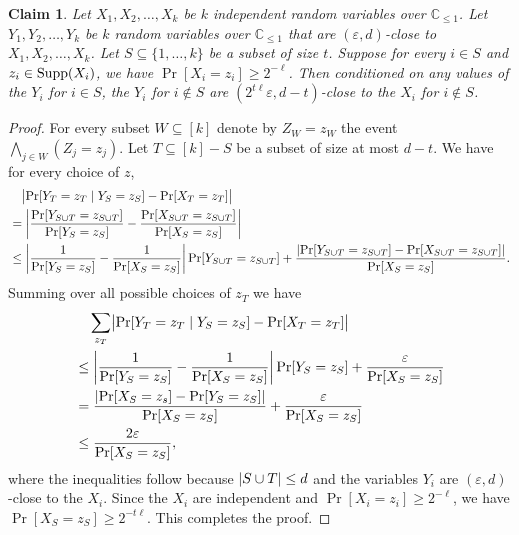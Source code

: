 \documentclass[11pt]{article}
\numberwithin{equation}{section}
\newtheorem{claim}[theorem]{Claim}
\theoremstyle{definition}
\theoremstyle{plain}
\newcommand{\C}{\mathbb C}
\def\eps{\varepsilon}
\def\Blocklength{\ell}
\def\cond{\mid}
\def\Supp{\textnormal{Supp}}
\DeclarePairedDelimiter{\abs}{\lvert}{\rvert}
\begin{document}
  \begin{claim} \label{claim-conditional}
    Let $X_1, X_2, \ldots, X_k$ be $k$ independent random variables over $\C_{\le 1}$.
    Let $Y_1, Y_2, \ldots, Y_k$ be $k$ random variables over $\C_{\le 1}$ that are $(\eps, d)$-close to $X_1, X_2, \ldots, X_k$.
    Let $S \subseteq \{1, \ldots, k\}$ be a subset of size $t$.
    Suppose for every $i \in S$ and $z_i \in \Supp(X_i)$, we have $\Pr[X_i = z_i] \ge 2^{-\Blocklength}$.
    Then conditioned on any values of the $Y_i$ for $i \in S$, the $Y_i$ for $i \not\in S$ are $(2^{t\Blocklength} \eps, d - t)$-close to the $X_i$ for $i \not\in S$.
  \end{claim}
  \begin{proof}
    For every subset $W \subseteq [k]$ denote by $Z_W = z_W$ the event $\bigwedge_{j \in W} (Z_j = z_j)$.
    Let $T \subseteq [k] - S$ be a subset of size at most $d - t$.
    We have for every choice of $z$,
    \begin{align*}
      &\quad \bigl| \Pr[Y_T = z_T \cond Y_S = z_S] - \Pr[X_T = z_T] \bigr| \\
      &= \left| \frac{\Pr[Y_{S \cup T} = z_{S \cup T}]}{\Pr[Y_S = z_S]} - \frac{\Pr[X_{S \cup T} = z_{S \cup T}]}{\Pr[X_S = z_S]} \right| \\
      &\le \left| \frac{1}{\Pr[Y_S = z_S]} - \frac{1}{\Pr[X_S = z_S]} \right| \Pr[Y_{S \cup T} = z_{S \cup T}] + \frac{\abs{\Pr[Y_{S \cup T} = z_{S \cup T}] - \Pr[X_{S \cup T} = z_{S \cup T}]}}{\Pr[X_S = z_S]}  .
    \end{align*}
    Summing over all possible choices of $z_T$ we have
    \begin{align*}
      &\quad \sum_{z_T} \bigl| \Pr[Y_T = z_T \cond Y_S = z_S] - \Pr[X_T = z_T] \bigr| \\
      &\le \left| \frac{1}{\Pr[Y_S = z_S]} - \frac{1}{\Pr[X_S = z_S]} \right| \Pr[Y_S = z_S] + \frac{\eps}{\Pr[X_S = z_S]} \\
      &= \frac{\abs{\Pr[X_S = z_s] - \Pr[Y_S = z_S]}}{\Pr[X_S = z_S]} + \frac{\eps}{\Pr[X_S = z_S]} \\
      &\le \frac{2 \eps}{\Pr[X_S = z_S]} ,
    \end{align*}
    where the inequalities follow because $\abs{S \cup T} \le d$ and the variables $Y_i$ are $(\eps, d)$-close to the $X_i$.
    Since the $X_i$ are independent and $\Pr[X_i = z_i] \ge 2^{-\Blocklength}$, we have $\Pr[X_S = z_S] \ge 2^{-t \Blocklength}$.
    This completes the proof.
  \end{proof}
  
\end{document}
